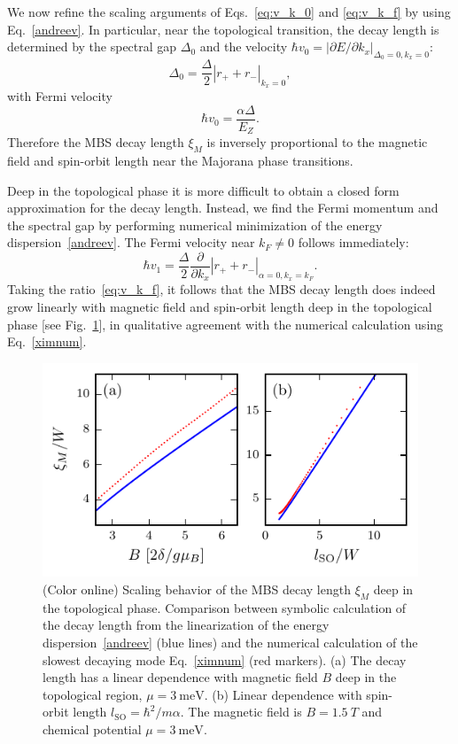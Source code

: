 We now refine the scaling arguments of Eqs.~\eqref{eq:v_k_0} and \eqref{eq:v_k_f} by using Eq.~\eqref{andreev}.
In particular, near the topological transition, the decay length is determined by the spectral gap $\Delta_0$ and the velocity $\hbar v_0=|\partial E/\partial k_x|_{\Delta_0=0,k_x=0}$:
\begin{equation}
\Delta_0=\frac{\Delta}{2}|r_++r_-|_{k_x=0},
\end{equation}
with Fermi velocity
\begin{equation}
\hbar v_0=\frac{\alpha\Delta}{E_Z}.
\end{equation}
Therefore the MBS decay length $\xi_M$ is inversely proportional to the magnetic field and spin-orbit length near the Majorana phase transitions.

Deep in the topological phase it is more difficult to obtain a closed form approximation for the decay length.
Instead, we find the Fermi momentum and the spectral gap by performing numerical minimization of the energy dispersion~\eqref{andreev}.
The Fermi velocity near $k_F\ne 0$ follows immediately:
\begin{equation}
\hbar v_1=\frac{\Delta}{2}\frac{\partial}{\partial k_x}|r_++r_-|_{\alpha=0,k_x=k_F}.
\end{equation}
Taking the ratio~\eqref{eq:v_k_f}, it follows that the MBS decay length does indeed grow linearly with magnetic field and spin-orbit length deep in the topological phase [see Fig.~\ref{fig:compAB}], in qualitative agreement with the numerical calculation using Eq.~\eqref{ximnum}.

\begin{figure}
\begin{center}
\includegraphics[width=0.7\columnwidth]{chapter_shortjunction/figures/compAB}
\caption{
(Color online)
Scaling behavior of the MBS decay length $\xi_M$ deep in the topological phase.
Comparison between symbolic calculation of the decay length from the linearization of the energy dispersion~\eqref{andreev} (blue lines) and the numerical calculation of the slowest decaying mode Eq.~\eqref{ximnum} (red markers).
(a) The decay length has a linear dependence with magnetic field $B$ deep in the topological region, $\mu=\SI{3}{\meV}$.
(b) Linear dependence with spin-orbit length $l_\mathrm{SO}=\hbar^2/m\alpha$.
The magnetic field is $B=\SI{1.5}{T}$ and chemical potential $\mu=\SI{3}{\meV}$.}
\label{fig:compAB}
\end{center}
\end{figure}

